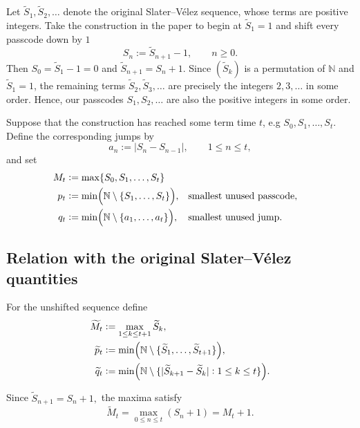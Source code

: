 Let $ \widetilde S_1,\widetilde S_2,\ldots $ denote the original Slater--Vélez sequence, whose terms are positive integers. Take the construction in the paper to begin at $\widetilde S_1=1$ and shift every passcode down by $1$
\begin{equation}
    S_n:=\widetilde S_{n+1}-1,
    \qquad n\geq 0.
\end{equation}
Then $S_0=\widetilde S_1-1=0$ and $ \widetilde S_{n+1}=S_n+1$. Since $(\widetilde S_k)$ is a permutation of $\mathbb N$ and $\widetilde S_1=1$, the remaining terms $\widetilde S_2,\widetilde S_3,\ldots$ are precisely the integers $2,3,\ldots$ in some order. Hence, our passcodes $S_1,S_2,\ldots$ are also the positive integers in some order.

Suppose that the construction has reached some term time $t$, e.g $ S_0,S_1,\ldots,S_t.$
Define the corresponding jumps by
\begin{equation}
    a_n:=|S_n-S_{n-1}|,
    \qquad 1\leq n\leq t,
\end{equation}
and set
\begin{align}
M_t
&:=
\max\{S_0,S_1,\ldots,S_t\}
\\
p_t
&:=
\min\Bigl(
\mathbb N\setminus\{S_1,\ldots,S_t\}
\Bigr),
&&\text{smallest unused passcode},
\\
q_t
&:=
\min\Bigl(
\mathbb N\setminus\{a_1,\ldots,a_t\}
\Bigr),
&&\text{smallest unused jump}.
\end{align}

\subsection*{Relation with the original Slater--Vélez quantities}

For the unshifted sequence define
\begin{align}
\widetilde M_t
&:=
\max_{1\leq k\leq t+1}\widetilde S_k,
\\
\widetilde p_t
&:=
\min\Bigl(
\mathbb N
\setminus
\{\widetilde S_1,\ldots,\widetilde S_{t+1}\}
\Bigr),
\\
\widetilde q_t
&:=
\min\Bigl(
\mathbb N
\setminus
\{
|\widetilde S_{k+1}-\widetilde S_k|
:1\leq k\leq t
\}
\Bigr).
\end{align}

\noindent
Since $\widetilde S_{n+1}=S_n+1,$ the maxima satisfy
\begin{equation}
\widetilde M_t
=
\max_{0\leq n\leq t}(S_n+1)
=
M_t+1.
\end{equation}

